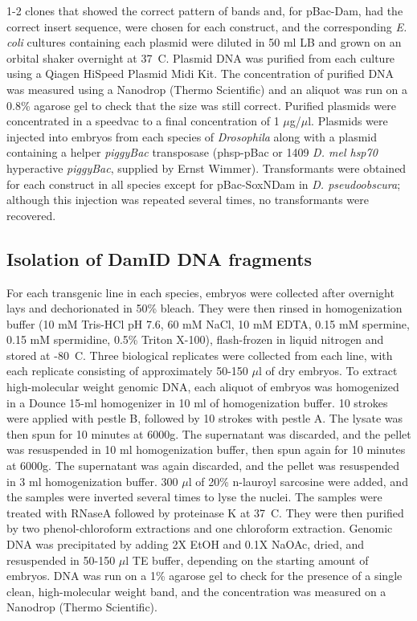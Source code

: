 1-2 clones that showed the correct pattern of bands and, for pBac-Dam, had the correct insert sequence, were chosen for each construct, and the corresponding \emph{E. coli} cultures containing each plasmid were diluted in 50 ml LB and grown on an orbital shaker overnight at 37\degree~C. Plasmid DNA was purified from each culture using a Qiagen HiSpeed Plasmid Midi Kit. The concentration of purified DNA was measured using a Nanodrop (Thermo Scientific) and an aliquot was run on a 0.8\% agarose gel to check that the size was still correct. Purified plasmids were concentrated in a speedvac to a final concentration of 1 \(\mu\)g/\(\mu\)l. Plasmids were injected into embryos from each species of \emph{Drosophila} along with a plasmid containing a helper \emph{piggyBac} transposase (phsp-pBac or 1409 \emph{D. mel hsp70} hyperactive \emph{piggyBac}, supplied by Ernst Wimmer). Transformants were obtained for each construct in all species except for pBac-SoxNDam in \emph{D. pseudoobscura}; although this injection was repeated several times, no transformants were recovered.

\subsection{Isolation of DamID DNA fragments}
For each transgenic line in each species, embryos were collected after overnight lays and dechorionated in 50\% bleach. They were then rinsed in homogenization buffer (10 mM Tris-HCl pH 7.6, 60 mM NaCl, 10 mM EDTA, 0.15 mM spermine, 0.15 mM spermidine, 0.5\% Triton X-100), flash-frozen in liquid nitrogen and stored at -80\degree~C. Three biological replicates were collected from each line, with each replicate consisting of approximately 50-150 \(\mu\)l of dry embryos. To extract high-molecular weight genomic DNA, each aliquot of embryos was homogenized in a Dounce 15-ml homogenizer in 10 ml of homogenization buffer. 10 strokes were applied with pestle B, followed by 10 strokes with pestle A. The lysate was then spun for 10 minutes at 6000g. The supernatant was discarded, and the pellet was resuspended in 10 ml homogenization buffer, then spun again for 10 minutes at 6000g. The supernatant was again discarded, and the pellet was resuspended in 3 ml homogenization buffer. 300 \(\mu\)l of 20\% n-lauroyl sarcosine were added, and the samples were inverted several times to lyse the nuclei. The samples were treated with RNaseA followed by proteinase K at 37\degree~C. They were then purified by two phenol-chloroform extractions and one chloroform extraction. Genomic DNA was precipitated by adding 2X EtOH and 0.1X NaOAc, dried, and resuspended in 50-150 \(\mu\)l TE buffer, depending on the starting amount of embryos. DNA was run on a 1\% agarose gel to check for the presence of a single clean, high-molecular weight band, and the concentration was measured on a Nanodrop (Thermo Scientific).

